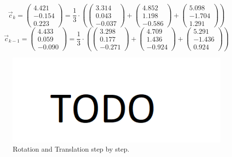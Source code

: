 \begin{equation*}
    \vec{c}_{k}=
    \begin{pmatrix}
        4.421 \\
        -0.154 \\
        0.223
    \end{pmatrix}
    =\frac{1}{3}\cdot\left(
    \begin{pmatrix}
        3.314 \\
        0.043 \\
        -0.037
    \end{pmatrix}
    +
    \begin{pmatrix}
        4.852 \\
        1.198 \\
        -0.586
    \end{pmatrix}
    +
    \begin{pmatrix}
        5.098 \\
        -1.704 \\
        1.291
    \end{pmatrix}
    \right)
\end{equation*}
\begin{equation*}
    \vec{c}_{k-1}=
    \begin{pmatrix}
        4.433 \\
        0.059 \\
        -0.090
    \end{pmatrix}
    =\frac{1}{3}\cdot\left(
        \begin{pmatrix}
            3.298 \\
            0.177 \\
            -0.271
        \end{pmatrix}
        +
        \begin{pmatrix}
            4.709 \\
            1.436 \\
            -0.924
        \end{pmatrix}
        +
        \begin{pmatrix}
            5.291 \\
            -1.436 \\
            0.924
        \end{pmatrix}
    \right)
\end{equation*}
\begin{figure}[H]
    \centering
    \includegraphics[width=1.0\textwidth]{images/todo.png}
    \caption{Rotation and Translation step by step.}
    \label{im:SVD_step_by_step}
\end{figure}

